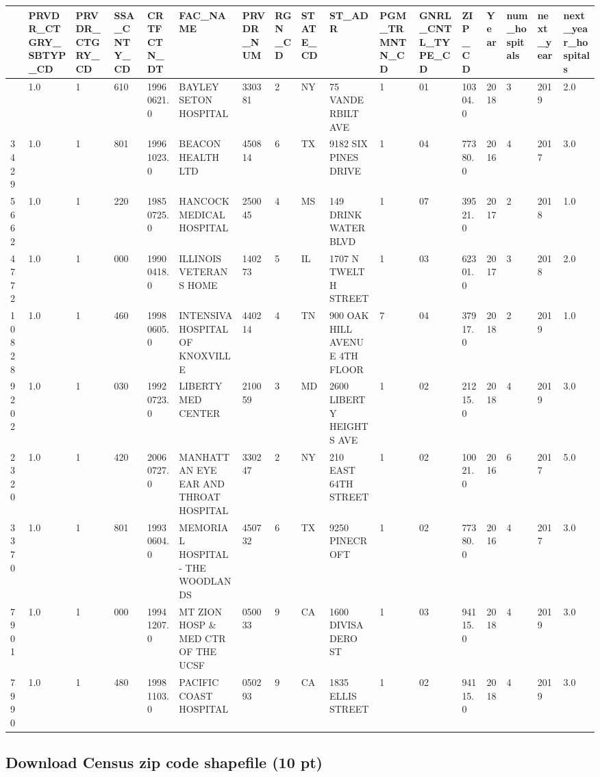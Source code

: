 \documentclass[
  letterpaper,
  DIV=11,
  numbers=noendperiod]{scrartcl}
\begin{document}
\begin{longtable}[]{@{}lllllllllllllllll@{}}
\toprule\noalign{}
& PRVDR\_CTGRY\_SBTYP\_CD & PRVDR\_CTGRY\_CD & SSA\_CNTY\_CD &
CRTFCTN\_DT & FAC\_NAME & PRVDR\_NUM & RGN\_CD & STATE\_CD & ST\_ADR &
PGM\_TRMNTN\_CD & GNRL\_CNTL\_TYPE\_CD & ZIP\_CD & Year & num\_hospitals
& next\_year & next\_year\_hospitals \\
\midrule\noalign{}
\endhead
\bottomrule\noalign{}
\endlastfoot
10098 & 1.0 & 1 & 610 & 19960621.0 & BAYLEY SETON HOSPITAL & 330381 & 2
& NY & 75 VANDERBILT AVE & 1 & 01 & 10304.0 & 2018 & 3 & 2019 & 2.0 \\
3429 & 1.0 & 1 & 801 & 19961023.0 & BEACON HEALTH LTD & 450814 & 6 & TX
& 9182 SIX PINES DRIVE & 1 & 04 & 77380.0 & 2016 & 4 & 2017 & 3.0 \\
5662 & 1.0 & 1 & 220 & 19850725.0 & HANCOCK MEDICAL HOSPITAL & 250045 &
4 & MS & 149 DRINKWATER BLVD & 1 & 07 & 39521.0 & 2017 & 2 & 2018 &
1.0 \\
4772 & 1.0 & 1 & 000 & 19900418.0 & ILLINOIS VETERANS HOME & 140273 & 5
& IL & 1707 N TWELTH STREET & 1 & 03 & 62301.0 & 2017 & 3 & 2018 &
2.0 \\
10828 & 1.0 & 1 & 460 & 19980605.0 & INTENSIVA HOSPITAL OF KNOXVILLE &
440214 & 4 & TN & 900 OAK HILL AVENUE 4TH FLOOR & 7 & 04 & 37917.0 &
2018 & 2 & 2019 & 1.0 \\
9202 & 1.0 & 1 & 030 & 19920723.0 & LIBERTY MED CENTER & 210059 & 3 & MD
& 2600 LIBERTY HEIGHTS AVE & 1 & 02 & 21215.0 & 2018 & 4 & 2019 & 3.0 \\
2320 & 1.0 & 1 & 420 & 20060727.0 & MANHATTAN EYE EAR AND THROAT
HOSPITAL & 330247 & 2 & NY & 210 EAST 64TH STREET & 1 & 02 & 10021.0 &
2016 & 6 & 2017 & 5.0 \\
3370 & 1.0 & 1 & 801 & 19930604.0 & MEMORIAL HOSPITAL - THE WOODLANDS &
450732 & 6 & TX & 9250 PINECROFT & 1 & 02 & 77380.0 & 2016 & 4 & 2017 &
3.0 \\
7901 & 1.0 & 1 & 000 & 19941207.0 & MT ZION HOSP \& MED CTR OF THE UCSF
& 050033 & 9 & CA & 1600 DIVISADERO ST & 1 & 03 & 94115.0 & 2018 & 4 &
2019 & 3.0 \\
7990 & 1.0 & 1 & 480 & 19981103.0 & PACIFIC COAST HOSPITAL & 050293 & 9
& CA & 1835 ELLIS STREET & 1 & 02 & 94115.0 & 2018 & 4 & 2019 & 3.0 \\
\end{longtable}

\subsection{Download Census zip code shapefile (10
pt)}\label{download-census-zip-code-shapefile-10-pt}
\end{document}
